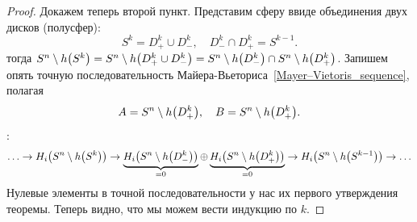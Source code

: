 \begin{proof}
        Докажем теперь второй пункт. Представим сферу ввиде объединения двух дисков (полусфер):
        \[ S^k = D^k_{+} \cup D^k_{-}, \quad D_{-}^{k} \cap D_{+}^{k} = S^{k - 1}. \]
        тогда $S^n \setminus h\lr*{S^k} = S^n \setminus h\lr*{D^{k}_{+} \cup D^{k}_{-}} = S^n \setminus h\lr*{D_{-}^k} \cap S^n \setminus h\lr*{D_{+}^k}$.
        Запишем опять точную последовательность Майера-Вьеториса~\ref{Mayer–Vietoris_sequence}, полагая
        \[ A = S^n \setminus h\lr*{D_{+}^k}, \quad B = S^n \setminus h\lr*{D_{+}^k}. \]:
        \[ \ldots \to H_{i}\lr*{S^n \setminus h\lr*{S^{k}}} \to \underbrace{H_{i}\lr*{S^n \setminus h\lr*{D^k_{-}}}}_{= 0} \oplus \underbrace{H_{i}\lr*{S^n \setminus h\lr*{D^k_{+}}}}_{= 0} \to H_{i}\lr*{S^n \setminus h\lr*{S^{k - 1}}} \to \ldots  \]
        Нулевые элементы в точной последовательности у нас их первого утверждения теоремы. Теперь видно, что мы можем вести индукцию по $k$.
    \end{proof}

